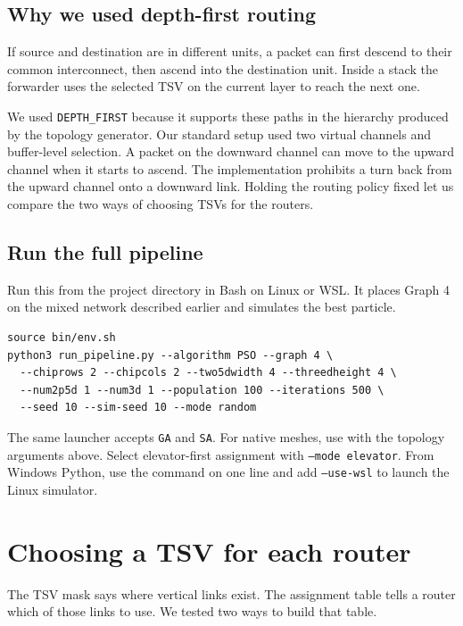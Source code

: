 \documentclass[12pt,a4paper]{article}
\newcommand{\code}[1]{\texttt{#1}}
\begin{document}
\subsection{Why we used depth-first routing}

If source and destination are in different units, a packet can first descend to their common interconnect, then ascend into the destination unit. Inside a stack the forwarder uses the selected TSV on the current layer to reach the next one.

We used \code{DEPTH\_FIRST} because it supports these paths in the hierarchy produced by the topology generator. Our standard setup used two virtual channels and buffer-level selection. A packet on the downward channel can move to the upward channel when it starts to ascend. The implementation prohibits a turn back from the upward channel onto a downward link. Holding the routing policy fixed let us compare the two ways of choosing TSVs for the routers.

\subsection{Run the full pipeline}

Run this from the project directory in Bash on Linux or WSL. It places Graph 4 on the mixed network described earlier and simulates the best particle.

{\small
\begin{verbatim}
source bin/env.sh
python3 run_pipeline.py --algorithm PSO --graph 4 \
  --chiprows 2 --chipcols 2 --two5dwidth 4 --threedheight 4 \
  --num2p5d 1 --num3d 1 --population 100 --iterations 500 \
  --seed 10 --sim-seed 10 --mode random
\end{verbatim}
}

The same launcher accepts \code{GA} and \code{SA}. For native meshes, use  with the topology arguments above. Select elevator-first assignment with \code{--mode elevator}. From Windows Python, use the command on one line and add \code{--use-wsl} to launch the Linux simulator.


\clearpage
\section{Choosing a TSV for each router}

The TSV mask says where vertical links exist. The assignment table tells a router which of those links to use. We tested two ways to build that table.
\end{document}
